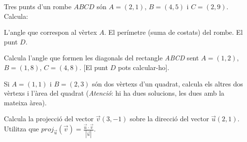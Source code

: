 \begin{activitats}
\begin{mylist}
	 \exer  Tres punts d'un rombe $ABCD$ són  \linebreak $A = (2, 1)$, $B = (4, 5)$ i ${C} = (2, 9)$. Calcula:
	 \begin{tasks}
	 	\task  L'angle que correspon al vèrtex $A$.
	 	\task  El perímetre (suma de costats) del rombe.
	 	\task  El punt $D$.
	 \end{tasks}
	 
	  
	 \exer  Calcula l'angle que formen les diagonals del rectangle \textit{ABCD} sent  $A = (1,2)$, $B = (1, 8)$, $C= (4, 8)$. [El punt $D$ pots calcular-ho].
	 
	  
	 \exer  Si  $A = (1, 1)$ i $B = (2, 3)$ són dos vèrtexs d'un quadrat, calcula els altres dos vèrtexs i l'àrea del quadrat (\textit{Atenció}: hi ha dues solucions, les dues amb la mateixa àrea).
	 
	  
	 \exer Calcula la projecció del vector $\vec v(3,-1)$ sobre la direcció del vector $\vec u(2,1)$. Utilitza que $proj_{\vec u} (\vec v) =\frac{\vec u\cdot \vec v}{|\vec u|}$.
	  
\end{mylist}

\end{activitats}

